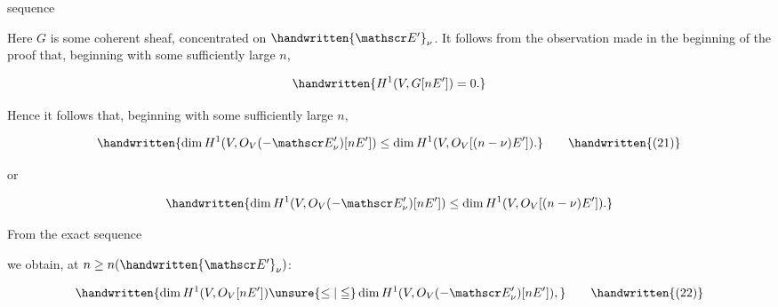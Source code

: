 
sequence


Here $G$ is some coherent sheaf, concentrated on $\handwritten{\mathscr E'}_\nu$.
It follows from the observation made in the beginning of
the proof that, beginning with some sufficiently large $n$,

\[
\handwritten{H^1(V,G[nE'])=0.}
\]

Hence it follows that, beginning with some sufficiently
large $n$,

\[
\handwritten{\dim H^1(V,O_V(-\mathscr E'_\nu)[nE'])\leq\dim H^1(V,O_V[(n-\nu)E']).}\tag*{\handwritten{(21)}}
\]

or

\[
\handwritten{\dim H^1(V,O_V(-\mathscr E'_\nu)[nE'])\leq\dim H^1(V,O_V[(n-\nu)E']).}
\]

From the exact sequence


we obtain, at $n\geq n(\handwritten{\mathscr E'}_\nu)$:

\[
\handwritten{\dim H^1(V,O_V[nE'])\unsure{\leq|\leqq}\dim H^1(V,O_V(-\mathscr E'_\nu)[nE']),}\tag*{\handwritten{(22)}}
\]

